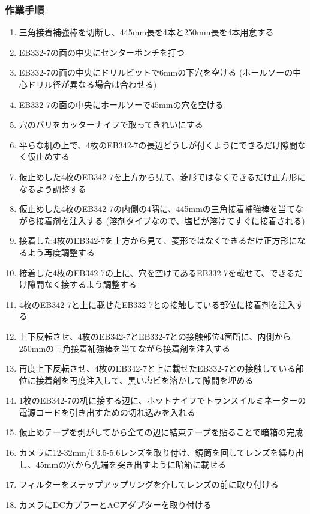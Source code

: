 \documentclass[titlepage,10pt,a4paper,uplatex]{jsbook}
\begin{document}
\subsubsection{作業手順}
\begin{enumerate}
\item 三角接着補強棒を切断し、445mm長を4本と250mm長を4本用意する
\item EB332-7の面の中央にセンターポンチを打つ
\item EB332-7の面の中央にドリルビットで6mmの下穴を空ける (ホールソーの中心ドリル径が異なる場合は合わせる)
\item EB332-7の面の中央にホールソーで45mmの穴を空ける
\item 穴のバリをカッターナイフで取ってきれいにする
\item 平らな机の上で、4枚のEB342-7の長辺どうしが付くようにできるだけ隙間なく仮止めする
\item 仮止めした4枚のEB342-7を上方から見て、菱形ではなくできるだけ正方形になるよう調整する
\item 仮止めした4枚のEB342-7の内側の4隅に、445mmの三角接着補強棒を当てながら接着剤を注入する (溶剤タイプなので、塩ビが溶けてすぐに接着される)
\item 接着した4枚のEB342-7を上方から見て、菱形ではなくできるだけ正方形になるよう再度調整する
\item 接着した4枚のEB342-7の上に、穴を空けてあるEB332-7を載せて、できるだけ隙間なく接するよう調整する
\item 4枚のEB342-7と上に載せたEB332-7との接触している部位に接着剤を注入する
\item 上下反転させ、4枚のEB342-7とEB332-7との接触部位4箇所に、内側から250mmの三角接着補強棒を当てながら接着剤を注入する
\item 再度上下反転させ、4枚のEB342-7と上に載せたEB332-7との接触している部位に接着剤を再度注入して、黒い塩ビを溶かして隙間を埋める
\item 1枚のEB342-7の机に接する辺に、ホットナイフでトランスイルミネーターの電源コードを引き出すための切れ込みを入れる
\item 仮止めテープを剥がしてから全ての辺に結束テープを貼ることで暗箱の完成
\item カメラに12-32mm/F3.5-5.6レンズを取り付け、鏡筒を回してレンズを繰り出し、45mmの穴から先端を突き出すように暗箱に載せる
\item フィルターをステップアップリングを介してレンズの前に取り付ける
\item カメラにDCカプラーとACアダプターを取り付ける
\end{enumerate}
\end{document}
